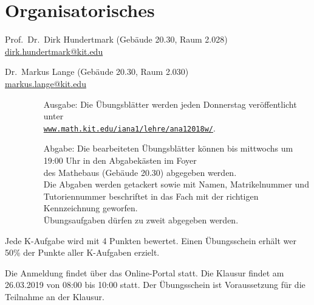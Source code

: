 \documentclass[../ana1.tex]{subfiles}
\begin{document}
\setcounter{section}{-1}

\section{Organisatorisches}
\begin{prosa}
    \begin{description}[style=nextline]
        \item[Dozent]
            Prof.\ Dr.\ Dirk Hundertmark (Gebäude 20.30, Raum 2.028)\\
            \href{mailto:dirk.hundertmark@kit.edu}{dirk.hundertmark@kit.edu}
        \item[Übungsleiter]
            Dr.\ Markus Lange (Gebäude 20.30, Raum 2.030)\\
            \href{mailto:markus.lange@kit.edu}{markus.lange@kit.edu}
        \item[Übungsaufgaben]
            \begin{description}
                \item[]
                \begin{enumerate}
                \item[]
                \item[Ausgabe:] Die Übungsblätter werden jeden Donnerstag veröffentlicht unter\\
                                \href{http://www.math.kit.edu/iana1/lehre/ana12018w/}{\texttt{www.math.kit.edu/iana1/lehre/ana12018w/}}.
                \item[Abgabe:] Die bearbeiteten Übungsblätter können bis mittwochs um 19:00 Uhr in den Abgabekästen im Foyer\\
                               des Mathebaus (Gebäude 20.30) abgegeben werden.\\ 
                               Die Abgaben werden getackert sowie mit Namen, Matrikelnummer und Tutoriennummer beschriftet in das Fach mit
                               der richtigen Kennzeichnung geworfen.\\
                               Übungsaufgaben dürfen zu zweit abgegeben werden.\\
                \end{enumerate}
            \end{description}
        \item[Übungsschein]
            Jede K-Aufgabe wird mit 4 Punkten bewertet. Einen Übungsschein erhält wer 50\% der Punkte aller K-Aufgaben erzielt.
        \item[Klausur]
            Die Anmeldung findet über das Online-Portal statt. Die Klausur findet am 26.03.2019 von 08:00 bis 10:00 statt.
            Der Übungsschein ist Voraussetzung für die Teilnahme an der Klausur.
    \end{description}
\end{prosa}
\end{document}
